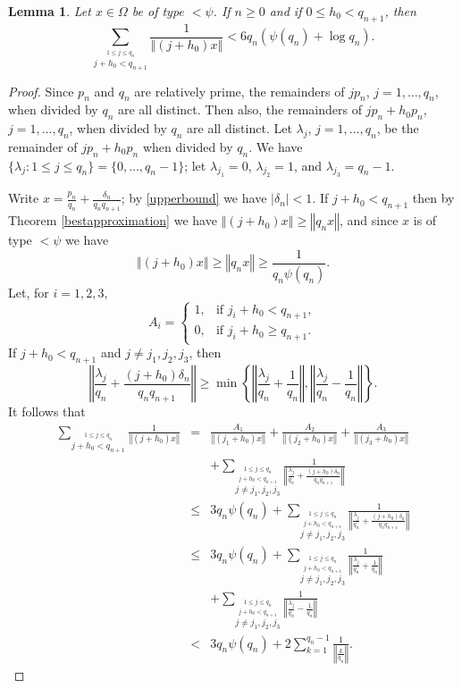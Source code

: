 \documentclass{amsart}
\newcommand{\norm}[1]{\left\Vert #1 \right\Vert}
\newtheorem{lemma}[theorem]{Lemma}
\begin{document}
\begin{lemma}
Let $x \in \Omega$ be of type $< \psi$. If $n \geq 0$ and if $0 \leq h_0 < q_{n+1}$, then
\[
\sum_{\stackrel{1 \leq j \leq q_n}{j+h_0<q_{n+1}}} \frac{1}{\norm{(j+h_0)x}} < 6 q_n(\psi(q_n)+\log q_n).
\]
\label{h0}
\end{lemma}
\begin{proof}
Since $p_n$ and $q_n$ are relatively prime, 
the remainders of $j p_n$, $j=1,\ldots,q_n$, when divided by $q_n$ are all distinct.
Then also, the remainders of $j p_n+h_0 p_n$, $j=1,\ldots,q_n$, when divided by $q_n$ are all distinct. Let $\lambda_j$, $j=1,\ldots,q_n$, be the remainder of $jp_n+
h_0p_n$  when divided by $q_n$. We have $\{\lambda_j: 1 \leq j \leq q_n\}=\{0,\ldots,q_n-1\}$; let $\lambda_{j_1}=0$, $\lambda_{j_2}=1$, and $\lambda_{j_3}=q_n-1$.


Write $x=\frac{p_n}{q_n}+\frac{\delta_n}{q_n q_{n+1}}$; by \eqref{upperbound} we have $|\delta_n|<1$. If $j+h_0<q_{n+1}$ then by
Theorem \ref{bestapproximation} we have $\norm{(j+h_0)x} \geq \norm{q_n x}$, 
and since $x$ is of type $<\psi$ we have
\[
\norm{(j+h_0)x} \geq \norm{q_n x} \geq \frac{1}{q_n \psi(q_n)}.
\] 
Let, for $i=1,2,3$,
\[
A_i=\begin{cases}
1,&\textrm{if $j_i+h_0<q_{n+1}$},\\
0,&\textrm{if $j_i+h_0 \geq q_{n+1}$}.
\end{cases}
\]
If $j+h_0<q_{n+1}$ and $j \neq j_1,j_2,j_3$, then 
\[\norm{\frac{\lambda_j}{q_n}+\frac{(j+h_0)\delta_n}{q_n q_{n+1}}} \geq \min \left\{ \norm{\frac{\lambda_j}{q_n}+\frac{1}{q_n}},\norm{\frac{\lambda_j}{q_n}-\frac{1}{q_n}}  \right\}.
\]
It follows that
\begin{eqnarray*}
\sum_{\stackrel{1 \leq j \leq q_n}{j+h_0<q_{n+1}}} \frac{1}{\norm{(j+h_0)x}}
&=&
\frac{A_1}{\norm{(j_1+h_0)x}}
+
\frac{A_2}{\norm{(j_2+h_0)x}}
+\frac{A_3}{\norm{(j_3+h_0)x}}\\
&&+
\sum_{\stackrel{1 \leq j \leq q_n}{\stackrel{j+h_0<q_{n+1}}{j \neq j_1, j_2, j_3}}} \frac{1}{\norm{\frac{\lambda_j}{q_n}+\frac{(j+h_0)\delta_n}{q_n q_{n+1}}}}\\
&\leq&3q_n\psi(q_n)+\sum_{\stackrel{1 \leq j \leq q_n}{\stackrel{j+h_0<q_{n+1}}{j \neq j_1, j_2, j_3}}} \frac{1}{\norm{\frac{\lambda_j}{q_n}+\frac{(j+h_0)\delta_n}{q_n q_{n+1}}}}\\
&\leq&3q_n\psi(q_n)+\sum_{\stackrel{1 \leq j \leq q_n}{\stackrel{j+h_0<q_{n+1}}{j \neq j_1, j_2, j_3}}} \frac{1}{\norm{\frac{\lambda_j}{q_n}+\frac{1}{q_n}}}\\
&&+\sum_{\stackrel{1 \leq j \leq q_n}{\stackrel{j+h_0<q_{n+1}}{j \neq j_1, j_2, j_3}}} \frac{1}{\norm{\frac{\lambda_j}{q_n}-\frac{1}{q_n}}}\\
&<&3q_n\psi(q_n)+2\sum_{k=1}^{q_n-1} \frac{1}{\norm{\frac{k}{q_n}}}.
\end{eqnarray*}




\end{proof}
\end{document}
